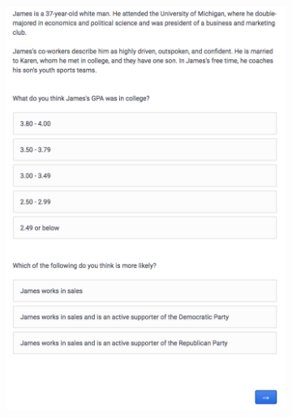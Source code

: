 \documentclass[12pt, letterpaper]{article}
\begin{document}
\begin{figure}[h!]
\centering
\caption{Vignettes for our modified Linda Problem and the maximal-contrast James experiment}\label{ep_figure_si}
\vspace{5mm}
\begin{subfigure}[t]{0.48\textwidth}
	\includegraphics[width=1\textwidth]{../figs/vig_james.png}
	\caption{}
\end{subfigure}
\begin{subfigure}[t]{0.48\textwidth}

\end{subfigure}
\end{figure}
\end{document}
